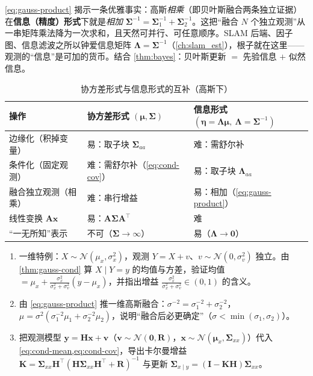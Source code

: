 \begin{insight}
\cref{eq:gauss-product} 揭示一条优雅事实：高斯\emph{相乘}（即贝叶斯融合两条独立证据）在\textbf{信息（精度）形式}下就是\emph{相加} $\boldsymbol{\Sigma}^{-1}=\boldsymbol{\Sigma}_1^{-1}+\boldsymbol{\Sigma}_2^{-1}$。这把“融合 $N$ 个独立观测”从一串矩阵乘法降为一次求和，且天然可并行、可任意顺序。SLAM 后端、因子图、信息滤波之所以钟爱信息矩阵 $\boldsymbol{\Lambda}=\boldsymbol{\Sigma}^{-1}$（\cref{ch:slam_est}），根子就在这里——观测的“信息”是可加的货币。结合 \cref{thm:bayes}：贝叶斯更新 $=$ 先验信息 $+$ 似然信息。
\end{insight}

\begin{table}[H]\centering\small
\caption{协方差形式与信息形式的互补（高斯下）}
\begin{tabular}{lll}
\toprule
操作 & 协方差形式 $(\boldsymbol{\mu},\boldsymbol{\Sigma})$ & 信息形式 $(\boldsymbol{\eta}=\boldsymbol{\Lambda}\boldsymbol{\mu},\ \boldsymbol{\Lambda}=\boldsymbol{\Sigma}^{-1})$ \\
\midrule
边缘化（积掉变量） & 易：取子块 $\boldsymbol{\Sigma}_{aa}$ & 难：需舒尔补 \\
条件化（固定观测） & 难：需舒尔补（\cref{eq:cond-cov}） & 易：取子块 $\boldsymbol{\Lambda}_{aa}$ \\
融合独立观测（相乘） & 难：串行增益 & 易：相加（\cref{eq:gauss-product}） \\
线性变换 $\mathbf{A}\mathbf{x}$ & 易：$\mathbf{A}\boldsymbol{\Sigma}\mathbf{A}^\top$ & 难 \\
“一无所知”表示 & 不可（$\boldsymbol{\Sigma}\to\infty$） & 易（$\boldsymbol{\Lambda}\to\mathbf{0}$） \\
\bottomrule
\end{tabular}
\end{table}

\begin{practice}
\begin{enumerate}
  \item 一维特例：$X\sim\mathcal{N}(\mu_x,\sigma_x^2)$，观测 $Y=X+v$、$v\sim\mathcal{N}(0,\sigma_v^2)$ 独立。由 \cref{thm:gauss-cond} 算 $X\mid Y=y$ 的均值与方差，验证均值 $=\mu_x+\frac{\sigma_x^2}{\sigma_x^2+\sigma_v^2}(y-\mu_x)$，并指出增益 $\frac{\sigma_x^2}{\sigma_x^2+\sigma_v^2}\in(0,1)$ 的含义。
  \item 由 \cref{eq:gauss-product} 推一维高斯融合：$\sigma^{-2}=\sigma_1^{-2}+\sigma_2^{-2}$，$\mu=\sigma^2(\sigma_1^{-2}\mu_1+\sigma_2^{-2}\mu_2)$，说明“融合后必更确定”（$\sigma<\min(\sigma_1,\sigma_2)$）。
  \item 把观测模型 $\mathbf{y}=\mathbf{H}\mathbf{x}+\mathbf{v}$（$\mathbf{v}\sim\mathcal{N}(\mathbf{0},\mathbf{R})$，$\mathbf{x}\sim\mathcal{N}(\boldsymbol{\mu}_x,\boldsymbol{\Sigma}_{xx})$）代入 \cref{eq:cond-mean,eq:cond-cov}，导出卡尔曼增益 $\mathbf{K}=\boldsymbol{\Sigma}_{xx}\mathbf{H}^\top(\mathbf{H}\boldsymbol{\Sigma}_{xx}\mathbf{H}^\top+\mathbf{R})^{-1}$ 与更新 $\boldsymbol{\Sigma}_{x\mid y}=(\mathbf{I}-\mathbf{K}\mathbf{H})\boldsymbol{\Sigma}_{xx}$。
\end{enumerate}
\end{practice}


